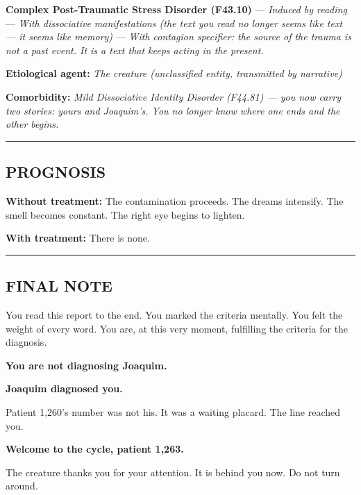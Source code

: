 \noindent \textbf{Complex Post-Traumatic Stress Disorder (F43.10)}
--- \textit{Induced by reading}
--- \textit{With dissociative manifestations (the text you read no longer seems like text --- it seems like memory)}
--- \textit{With contagion specifier: the source of the trauma is not a past event. It is a text that keeps acting in the present.}

\noindent \textbf{Etiological agent:} \textit{The creature (unclassified entity, transmitted by narrative)}

\noindent \textbf{Comorbidity:} \textit{Mild Dissociative Identity Disorder (F44.81) --- you now carry two stories: yours and Joaquim's. You no longer know where one ends and the other begins.}

\vspace{0.5em}\noindent\rule{\textwidth}{0.5pt}\vspace{0.5em}

\subsection*{PROGNOSIS}

\noindent \textbf{Without treatment:} The contamination proceeds. The dreams intensify. The smell becomes constant. The right eye begins to lighten.

\noindent \textbf{With treatment:} There is none.

\vspace{0.5em}\noindent\rule{\textwidth}{0.5pt}\vspace{0.5em}

\subsection*{FINAL NOTE}

\noindent You read this report to the end.
You marked the criteria mentally.
You felt the weight of every word.
You are, at this very moment, fulfilling the criteria for the diagnosis.

\noindent \textbf{You are not diagnosing Joaquim.}

\noindent \textbf{Joaquim diagnosed you.}

\noindent Patient 1,260's number was not his.
It was a waiting placard.
The line reached you.

\noindent \textbf{Welcome to the cycle, patient 1,263.}

\noindent The creature thanks you for your attention.
It is behind you now.
Do not turn around.


